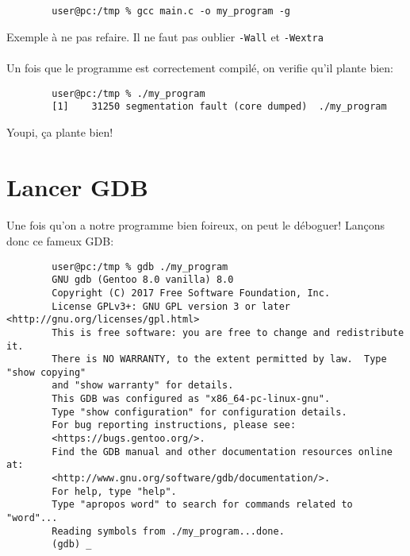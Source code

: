 \begin{listing}[H]
	\begin{verbatim}
		user@pc:/tmp % gcc main.c -o my_program -g
	\end{verbatim}
	\caption{Exemple à ne pas refaire. Il ne faut pas oublier
		\texttt{-Wall} et \texttt{-Wextra}}
\end{listing}

\paragraph{} Un fois que le programme est correctement compilé, on verifie
qu'il plante bien:

\begin{listing}[H]
	\begin{verbatim}
		user@pc:/tmp % ./my_program
		[1]    31250 segmentation fault (core dumped)  ./my_program
	\end{verbatim}
	\caption{Youpi, ça plante bien!}
\end{listing}

\section{Lancer GDB}

\paragraph{} Une fois qu'on a notre programme bien foireux, on peut le
déboguer! Lançons donc ce fameux GDB:

\begin{listing}[H]
	\begin{verbatim}
		user@pc:/tmp % gdb ./my_program
		GNU gdb (Gentoo 8.0 vanilla) 8.0
		Copyright (C) 2017 Free Software Foundation, Inc.
		License GPLv3+: GNU GPL version 3 or later <http://gnu.org/licenses/gpl.html>
		This is free software: you are free to change and redistribute it.
		There is NO WARRANTY, to the extent permitted by law.  Type "show copying"
		and "show warranty" for details.
		This GDB was configured as "x86_64-pc-linux-gnu".
		Type "show configuration" for configuration details.
		For bug reporting instructions, please see:
		<https://bugs.gentoo.org/>.
		Find the GDB manual and other documentation resources online at:
		<http://www.gnu.org/software/gdb/documentation/>.
		For help, type "help".
		Type "apropos word" to search for commands related to "word"...
		Reading symbols from ./my_program...done.
		(gdb) _
	\end{verbatim}
\end{listing}

